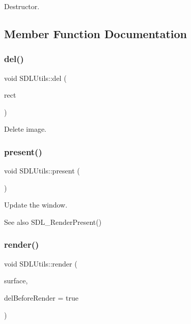 Destructor. 



\subsection{Member Function Documentation}
\mbox{\label{class_s_d_l_utils_a8dfdc8f41938c2c53ac5121c10eb1638}} 
\subsubsection{\texorpdfstring{del()}{del()}}
{\footnotesize\ttfamily void S\+D\+L\+Utils\+::del (\begin{DoxyParamCaption}\item[{S\+D\+L\+\_\+\+Rect}]{rect }\end{DoxyParamCaption})\hspace{0.3cm}{\ttfamily [virtual]}}



Delete image. 

\mbox{\label{class_s_d_l_utils_a0e9c4b007ae61772a1c41592877b30ab}} 
\subsubsection{\texorpdfstring{present()}{present()}}
{\footnotesize\ttfamily void S\+D\+L\+Utils\+::present (\begin{DoxyParamCaption}{ }\end{DoxyParamCaption})\hspace{0.3cm}{\ttfamily [virtual]}}



Update the window. 

\begin{DoxySeeAlso}{See also}
S\+D\+L\+\_\+\+Render\+Present() 
\end{DoxySeeAlso}
\mbox{\label{class_s_d_l_utils_aa13484f180cbea3441730382e108906c}} 
\subsubsection{\texorpdfstring{render()}{render()}}
{\footnotesize\ttfamily void S\+D\+L\+Utils\+::render (\begin{DoxyParamCaption}\item[{\mbox{\hyperlink{class_i_surface}{I\+Surface}} $\ast$}]{surface,  }\item[{bool}]{del\+Before\+Render = {\ttfamily true} }\end{DoxyParamCaption})\hspace{0.3cm}{\ttfamily [virtual]}}



